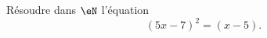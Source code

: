 
\begin{exercice}\label{exosmath-0223}

    Résoudre dans \( \eN \) l'équation
    \begin{equation}
        (5x-7)^2=(x-5).
    \end{equation}

\end{exercice}
